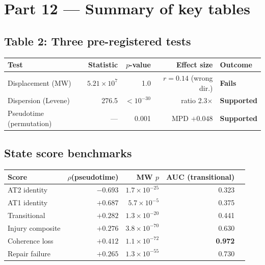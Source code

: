 \documentclass[11pt]{article}
\begin{document}
\section{Part 12 --- Summary of key tables}

\subsection{Table 2: Three pre-registered tests}

\begin{center}
\small
\begin{tabular}{lrrrl}
\toprule
Test & Statistic & $p$-value & Effect size & Outcome \\
\midrule
Displacement (MW) & $5.21 \times 10^7$ & 1.0 & $r = 0.14$ (wrong dir.) & \textbf{Fails} \\
Dispersion (Levene) & 276.5 & $< 10^{-30}$ & ratio 2.3$\times$ & \textbf{Supported} \\
Pseudotime (permutation) & --- & 0.001 & MPD $+0.048$ & \textbf{Supported} \\
\bottomrule
\end{tabular}
\end{center}

\subsection{State score benchmarks}

\begin{center}
\small
\begin{tabular}{lrrrr}
\toprule
Score & $\rho$(pseudotime) & MW $p$ & AUC (transitional) \\
\midrule
AT2 identity & $-0.693$ & $1.7 \times 10^{-25}$ & 0.323 \\
AT1 identity & $+0.687$ & $5.7 \times 10^{-5}$ & 0.375 \\
Transitional & $+0.282$ & $1.3 \times 10^{-20}$ & 0.441 \\
Injury composite & $+0.276$ & $3.8 \times 10^{-70}$ & 0.630 \\
Coherence loss & $+0.412$ & $1.1 \times 10^{-72}$ & \textbf{0.972} \\
Repair failure & $+0.265$ & $1.3 \times 10^{-55}$ & 0.730 \\
\bottomrule
\end{tabular}
\end{center}
\end{document}
